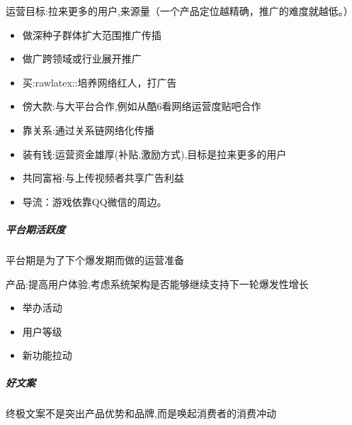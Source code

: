 \documentclass[letterpaper,11pt,english]{sphinxmanual}
\begin{document}
运营目标:拉来更多的用户,来源量（一个产品定位越精确，推广的难度就越低。）
\begin{itemize}
\item {} 
做深种子群体扩大范围推广传插

\item {} 
做广跨领域或行业展开推广

\item {} 
买:raw\sphinxhyphen{}latex::培养网络红人，打广告

\item {} 
傍大款:与大平台合作,例如从酷6看网络运营度贴吧合作%
\begin{footnote}[396]\sphinxAtStartFootnote
{}
%
\end{footnote}

\item {} 
靠关系:通过关系链网络化传播

\item {} 
装有钱:运营资金雄厚(补贴,激励方式),目标是拉来更多的用户

\item {} 
共同富裕:与上传视频者共享广告利益

\item {} 
导流：游戏依靠QQ微信的周边。

\end{itemize}


\subparagraph{平台期活跃度}
\label{\detokenize{chapter_idea/GTM:id11}}
平台期是为了下个爆发期而做的运营准备

产品:提高用户体验,考虑系统架构是否能够继续支持下一轮爆发性增长
\begin{itemize}
\item {} 
举办活动

\item {} 
用户等级

\item {} 
新功能拉动
%
\begin{footnote}[397]\sphinxAtStartFootnote
{}
%
\end{footnote}

\end{itemize}


\subparagraph{好文案}
\label{\detokenize{chapter_idea/GTM:id12}}
终极文案不是突出产品优势和品牌,而是唤起消费者的消费冲动
\end{document}
